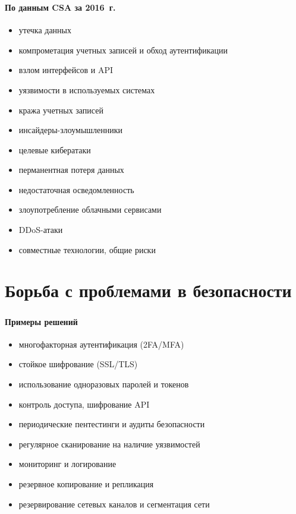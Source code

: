 \begin{frame}
\frametitle{\insertsection}
\framesubtitle{По данным CSA за 2016~г.}

\begin{itemize}
    \item утечка данных
    \item компрометация учетных записей и обход аутентификации
    \item взлом интерфейсов и API
    \item уязвимости в используемых системах
    \item кража учетных записей
    \item инсайдеры-злоумышленники
    \item целевые кибератаки
    \item перманентная потеря данных
    \item недостаточная осведомленность
    \item злоупотребление облачными сервисами
    \item DDoS-атаки
    \item совместные технологии, общие риски
\end{itemize}
\end{frame}


\section{Борьба с проблемами в безопасности}

\begin{frame}
\frametitle{\insertsection}
\framesubtitle{Примеры решений}

\begin{itemize}
    \item многофакторная аутентификация (2FA/MFA)
    \item стойкое шифрование (SSL/TLS)
    \item использование одноразовых паролей и токенов
    \item контроль доступа, шифрование API
    \item периодические пентестинги и аудиты безопасности
    \item регулярное сканирование на наличие уязвимостей
    \item мониторинг и логирование
    \item резервное копирование и репликация
    \item резервирование сетевых каналов и сегментация сети
\end{itemize}
\end{frame}

